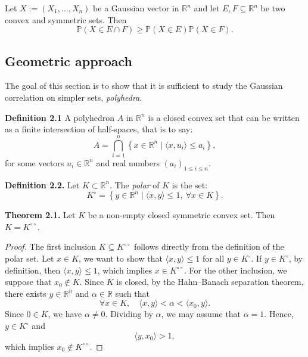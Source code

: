 \documentclass[12pt]{article}
\begin{document}
Let $X := (X_1, \dots, X_n)$ be a Gaussian vector in $\mathbb{R}^n$ and let $E, F \subseteq \mathbb{R}^n$ be two convex and symmetric sets. Then
\[
\mathbb{P}(X \in E \cap F) \geq \mathbb{P}(X \in E) \mathbb{P}(X \in F).
\]

\subsection{Geometric approach}
The goal of this section is to show that it is sufficient to study the Gaussian correlation on simpler sets, \emph{polyhedra}.

\vspace{0.3cm}
\textbf{Definition 2.1} A polyhedron $A$ in $\mathbb{R}^n$ is a closed convex set that can be written as a finite intersection of half-spaces, that is to say:
\[
A = \bigcap_{i=1}^{n} \left\{ x \in \mathbb{R}^n \mid \langle x, u_i \rangle \leq a_i \right\},
\]
for some vectors $u_i \in \mathbb{R}^n$ and real numbers $(a_i)_{1 \leq i \leq n}$.\\

\vspace{0.3cm}

\textbf{Definition 2.2.} Let $K \subset \mathbb{R}^n$. The \emph{polar} of $K$ is the set:
\[
K^\circ = \left\{ y \in \mathbb{R}^n \mid \langle x, y \rangle \leq 1, \ \forall x \in K \right\}.
\]

\vspace{0.3cm}

\textbf{Theorem 2.1.}
Let $K$ be a non-empty closed symmetric convex set.
Then $K = K^{\circ\circ}$.

\begin{proof}
The first inclusion $K \subseteq K^{\circ\circ}$ follows directly from the definition of the polar set. Let $x \in K$, we want to show that $\langle x, y \rangle \leq 1$ for all $y \in K^\circ$. If $y \in K^\circ$, by definition, then $\langle x, y \rangle \leq 1$, which implies $x \in K^{\circ\circ}$.
For the other inclusion, we suppose that $x_0 \notin K$. Since $K$ is closed, by the Hahn--Banach separation theorem, there exists $y \in \mathbb{R}^n$ and $\alpha \in \mathbb{R}$ such that
\[
\forall x \in K, \quad \langle x, y \rangle < \alpha < \langle x_0, y \rangle.
\]
Since $0 \in K$, we have $\alpha \neq 0$. Dividing by $\alpha$, we may assume that $\alpha = 1$. Hence, $y \in K^{\circ}$ and
\[
\langle y, x_0 \rangle > 1,
\]
which implies $x_0 \notin K^{\circ\circ}$.
\end{proof}
\end{document}
